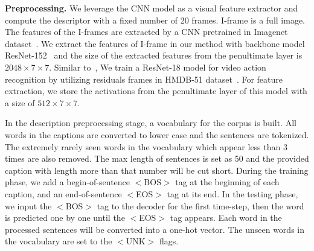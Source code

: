 \documentclass[a4paper,conference]{IEEEtran}
\begin{document}
\noindent\textbf{Preprocessing.} 
We leverage the CNN model as a visual feature extractor and compute the descriptor with a fixed number of 20 frames. I-frame is a full image. The features of the I-frames are extracted by a CNN pretrained in Imagenet dataset~\cite{russakovsky2015imagenet}. We extract the features of I-frame in our method with backbone model ResNet-152~\cite{he2016deep} and the size of the extracted features from the penultimate layer is $2048\times7\times7$. %
Similar to~\cite{wu2018compressed}, We train a  ResNet-18 model for video action recognition by utilizing residuals frames in HMDB-51 dataset~\cite{jhuang2011large}. For feature extraction, we store the activations from the penultimate layer of this model with a size of $512\times7\times7$. 


In the description preprocessing stage, a vocabulary for the corpus is built. All words in the captions are converted to lower case and the sentences are tokenized. The extremely rarely seen words in the vocabulary which appear less than 3 times are also removed.%
The max length of sentences is set as 50 and the provided caption with length more than that number will be cut short. During the training phase,  we add a begin-of-sentence $<$BOS$>$ tag at the beginning of each caption, and an end-of-sentence $<$EOS$>$ tag at its end.  In the testing phase, we input the $<$BOS$>$ tag to the decoder for the first time-step, then the word is predicted one by one until the $<$EOS$>$ tag appears. Each word in the processed sentences will be converted into a one-hot vector. The unseen words in the vocabulary are set to the $<$UNK$>$ flags.
\end{document}
